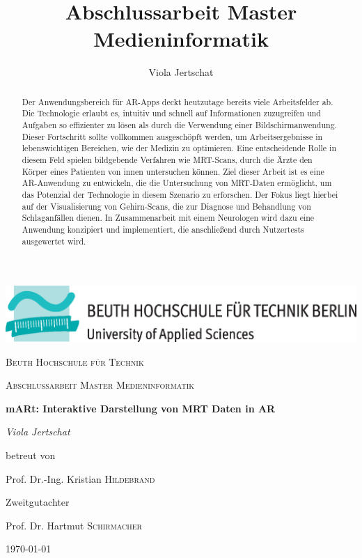 \documentclass[a4paper,11pt]{report}
\title{Abschlussarbeit Master Medieninformatik}
\author{Viola Jertschat}
\begin{document}
\begin{titlepage}
	\centering
	\includegraphics[width=\textwidth]{images/beuthlogo.eps}\par\vspace{1cm}
	{\scshape\LARGE Beuth Hochschule für Technik \par}
	\vspace{1cm}
	{\scshape\Large Abschlussarbeit Master Medieninformatik\par}
	\vspace{1.5cm}
	{\huge\bfseries mARt: Interaktive Darstellung von MRT Daten in AR\par}
	\vspace{2cm}
	{\Large\itshape Viola Jertschat\par}
	\vfill
	betreut von\par
	Prof. Dr.-Ing. Kristian \textsc{Hildebrand}
	
	\vfill
	Zweitgutachter\par
	Prof. Dr. Hartmut \textsc{Schirmacher}

	\vfill

	{\large \today\par}
\end{titlepage}

\begin{abstract} 
Der Anwendungsbereich für AR-Apps deckt heutzutage bereits viele Arbeitsfelder ab. Die Technologie erlaubt es, intuitiv und schnell auf Informationen zuzugreifen und Aufgaben so effizienter zu lösen als durch die Verwendung einer Bildschirmanwendung. Dieser Fortschritt sollte vollkommen ausgeschöpft werden, um Arbeitsergebnisse in lebenswichtigen Bereichen, wie der Medizin zu optimieren. 
Eine entscheidende Rolle in diesem Feld spielen bildgebende Verfahren wie MRT-Scans, durch die Ärzte den Körper eines Patienten von innen untersuchen können. 
Ziel dieser Arbeit ist es eine AR-Anwendung zu entwickeln, die die Untersuchung von MRT-Daten ermöglicht, um das Potenzial der Technologie in diesem Szenario zu erforschen. Der Fokus liegt hierbei auf der Visualisierung von Gehirn-Scans, die zur Diagnose und Behandlung von Schlaganfällen dienen. 
In Zusammenarbeit mit einem Neurologen wird dazu eine Anwendung konzipiert und implementiert, die anschließend durch Nutzertests ausgewertet wird.
\end{abstract}

\tableofcontents

\listoffigures

\printglossaries

\listoftodos


%









\pagebreak

\printbibliography
\end{document}
